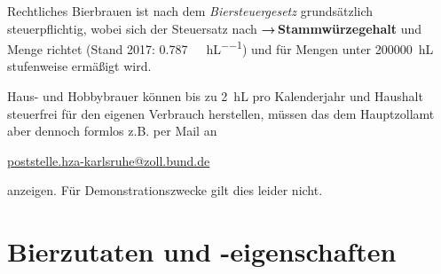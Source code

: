 \documentclass[9pt, ngerman]{beamer}
\newcommand{\forward}[1]{\textbf{→\,#1}}
\begin{document}
\begin{frame}{Rechtliches}
  Bierbrauen ist nach dem \emph{Biersteuergesetz} grundsätzlich steuerpflichtig,
  wobei sich der Steuersatz nach \forward{Stammwürzegehalt} und Menge richtet
  (Stand 2017: \SI{0.787}{\EUR\per\dP\per\hL}) und für Mengen unter
  \SI{200000}{\hL} stufenweise ermäßigt wird.

  Haus- und Hobbybrauer können bis zu \SI{2}{\hL} pro Kalenderjahr und Haushalt
  steuerfrei für den eigenen Verbrauch herstellen, müssen das dem Hauptzollamt
  aber dennoch formlos z.B. per Mail an
  \vspace{-0.5em}
  \begin{center}
    \href{mailto:poststelle.hza-karlsruhe@zoll.bund.de}{poststelle.hza-karlsruhe@zoll.bund.de}
  \end{center}
  \vspace{-0.5em}
  anzeigen. Für Demonstrationszwecke gilt dies leider nicht.
\end{frame}

\section{Bierzutaten und -eigenschaften}
\end{document}
